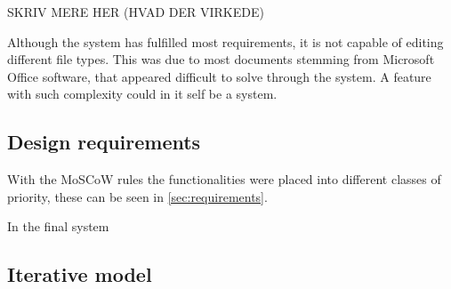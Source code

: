 SKRIV MERE HER (HVAD DER VIRKEDE)

Although the system has fulfilled most requirements, it is not capable of editing different file types. This was due to most documents stemming from Microsoft Office software, that appeared difficult to solve through the system. A feature with such complexity could in it self be a system.

\subsection{Design requirements}
With the MoSCoW rules the functionalities were placed into different classes of priority, these can be seen in \cref{sec:requirements}. 

In the final system 

\subsection{Iterative model}

